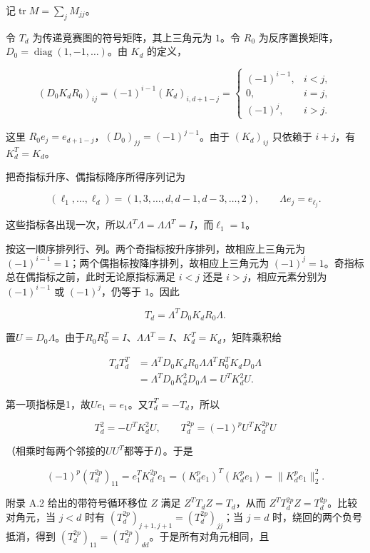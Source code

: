 \documentclass[11pt,a4paper]{article}
\begin{document}
记\(\operatorname{tr}M=\sum_jM_{jj}\)。

令 \(T_d\) 为传递竞赛图的符号矩阵，其上三角元为 \(1\)。令 \(R_0\) 为反序置换矩阵，\(D_0=\operatorname{diag}(1,-1,\ldots)\)。由 \(K_d\) 的定义，

\[
(D_0K_dR_0)_{ij}
=(-1)^{i-1}(K_d)_{i,d+1-j}
=\begin{cases}
(-1)^{i-1},&i<j,\\
0,&i=j,\\
(-1)^j,&i>j.
\end{cases}
\]

这里 \(R_0e_j=e_{d+1-j}\)，\((D_0)_{jj}=(-1)^{j-1}\)。由于 \((K_d)_{ij}\) 只依赖于 \(i+j\)，有 \(K_d^T=K_d\)。

把奇指标升序、偶指标降序所得序列记为

\[
(\ell_1,\ldots,\ell_d)=(1,3,\ldots,d,d-1,d-3,\ldots,2),
\qquad \Lambda e_j=e_{\ell_j}.
\]

这些指标各出现一次，所以\(\Lambda^T\Lambda=\Lambda\Lambda^T=I\)，而\(\ell_1=1\)。

按这一顺序排列行、列。两个奇指标按升序排列，故相应上三角元为 \((-1)^{i-1}=1\)；两个偶指标按降序排列，故相应上三角元为 \((-1)^j=1\)。奇指标总在偶指标之前，此时无论原指标满足 \(i<j\) 还是 \(i>j\)，相应元素分别为 \((-1)^{i-1}\) 或 \((-1)^j\)，仍等于 \(1\)。因此

\[
T_d=\Lambda^TD_0K_dR_0\Lambda.
\]

置\(U=D_0\Lambda\)。由于\(R_0R_0^T=I\)、\(\Lambda\Lambda^T=I\)、\(K_d^T=K_d\)，矩阵乘积给

\[
\begin{aligned}
T_dT_d^T
&=\Lambda^TD_0K_dR_0\Lambda
\Lambda^TR_0^TK_dD_0\Lambda\\
&=\Lambda^TD_0K_d^2D_0\Lambda=U^TK_d^2U.
\end{aligned}
\]

第一项指标是1，故\(Ue_1=e_1\)。又\(T_d^T=-T_d\)，所以

\[
T_d^2=-U^TK_d^2U,\qquad
T_d^{2p}=(-1)^pU^TK_d^{2p}U
\]

（相乘时每两个邻接的\(UU^T\)都等于\(I\)）。于是

\[
(-1)^p(T_d^{2p})_{11}
=e_1^TK_d^{2p}e_1
=(K_d^pe_1)^T(K_d^pe_1)
=\|K_d^pe_1\|_2^2.
\]

附录 A.2 给出的带符号循环移位 \(Z\) 满足 \(Z^TT_dZ=T_d\)，从而 \(Z^TT_d^{2p}Z=T_d^{2p}\)。比较对角元，当 \(j<d\) 时有 \((T_d^{2p})_{j+1,j+1}=(T_d^{2p})_{jj}\)；当 \(j=d\) 时，绕回的两个负号抵消，得到 \((T_d^{2p})_{11}=(T_d^{2p})_{dd}\)。于是所有对角元相同，且
\end{document}
